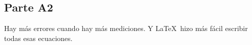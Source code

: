 \subsection{Parte A2}%
\label{sub:conclu_parte_a2}
Hay más errores cuando hay más mediciones.
Y \LaTeX\ hizo más fácil escribir todas esas ecuaciones.
